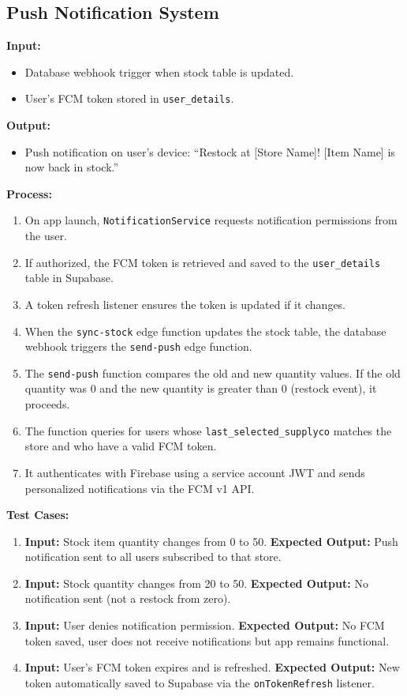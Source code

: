 \subsection{Push Notification System}

\textbf{Input:}
\begin{itemize}
    \item Database webhook trigger when stock table is updated.
    \item User's FCM token stored in \texttt{user\_details}.
\end{itemize}

\textbf{Output:}
\begin{itemize}
    \item Push notification on user's device: ``Restock at [Store Name]! [Item Name] is now back in stock.''
\end{itemize}

\textbf{Process:}
\begin{enumerate}
    \item On app launch, \texttt{NotificationService} requests notification permissions from the user.
    \item If authorized, the FCM token is retrieved and saved to the \texttt{user\_details} table in Supabase.
    \item A token refresh listener ensures the token is updated if it changes.
    \item When the \texttt{sync-stock} edge function updates the stock table, the database webhook triggers the \texttt{send-push} edge function.
    \item The \texttt{send-push} function compares the old and new quantity values. If the old quantity was 0 and the new quantity is greater than 0 (restock event), it proceeds.
    \item The function queries for users whose \texttt{last\_selected\_supplyco} matches the store and who have a valid FCM token.
    \item It authenticates with Firebase using a service account JWT and sends personalized notifications via the FCM v1 API.
\end{enumerate}

\textbf{Test Cases:}
\begin{enumerate}
    \item \textbf{Input:} Stock item quantity changes from 0 to 50. \textbf{Expected Output:} Push notification sent to all users subscribed to that store.

    \item \textbf{Input:} Stock quantity changes from 20 to 50. \textbf{Expected Output:} No notification sent (not a restock from zero).

    \item \textbf{Input:} User denies notification permission. \textbf{Expected Output:} No FCM token saved, user does not receive notifications but app remains functional.

    \item \textbf{Input:} User's FCM token expires and is refreshed. \textbf{Expected Output:} New token automatically saved to Supabase via the \texttt{onTokenRefresh} listener.
\end{enumerate}

